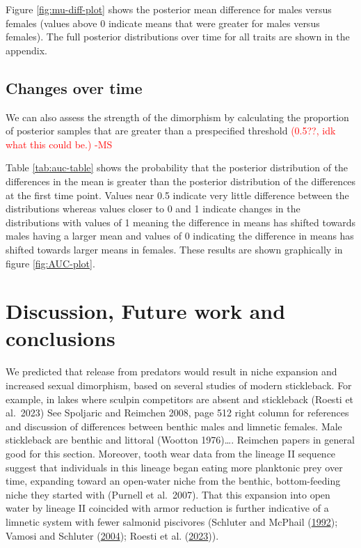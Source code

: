 \documentclass[
  12pt,
]{article}
\begin{document}
Figure \ref{fig:mu-diff-plot} shows the posterior mean difference for
males versus females (values above 0 indicate means that were greater
for males versus females). The full posterior distributions over time
for all traits are shown in the appendix.

\hypertarget{changes-over-time}{%
\subsection{Changes over time}\label{changes-over-time}}

We can also assess the strength of the dimorphism by calculating the
proportion of posterior samples that are greater than a prespecified
threshold \textcolor{red}{(0.5??, idk what this could be.) -MS}

Table \ref{tab:auc-table} shows the probability that the posterior
distribution of the differences in the mean is greater than the
posterior distribution of the differences at the first time point.
Values near 0.5 indicate very little difference between the
distributions whereas values closer to 0 and 1 indicate changes in the
distributions with values of 1 meaning the difference in means has
shifted towards males having a larger mean and values of 0 indicating
the difference in means has shifted towards larger means in females.
These results are shown graphically in figure \ref{fig:AUC-plot}.

\hypertarget{sec:conclusions}{%
\section{Discussion, Future work and
conclusions}\label{sec:conclusions}}

We predicted that release from predators would result in niche expansion
and increased sexual dimorphism, based on several studies of modern
stickleback. For example, in lakes where sculpin competitors are absent
and stickleback (Roesti et al.~2023) See Spoljaric and Reimchen 2008,
page 512 right column for references and discussion of differences
between benthic males and limnetic females. Male stickleback are benthic
and littoral (Wootton 1976)\ldots. Reimchen papers in general good for
this section. Moreover, tooth wear data from the lineage II sequence
suggest that individuals in this lineage began eating more planktonic
prey over time, expanding toward an open-water niche from the benthic,
bottom-feeding niche they started with (Purnell et al.~2007). That this
expansion into open water by lineage II coincided with armor reduction
is further indicative of a limnetic system with fewer salmonid
piscivores (Schluter and McPhail
(\protect\hyperlink{ref-SchluterandMcPhail1992}{1992}); Vamosi and
Schluter (\protect\hyperlink{ref-VamosiandSchluter2004}{2004}); Roesti
et al. (\protect\hyperlink{ref-Roestietal2023}{2023})).
\end{document}
